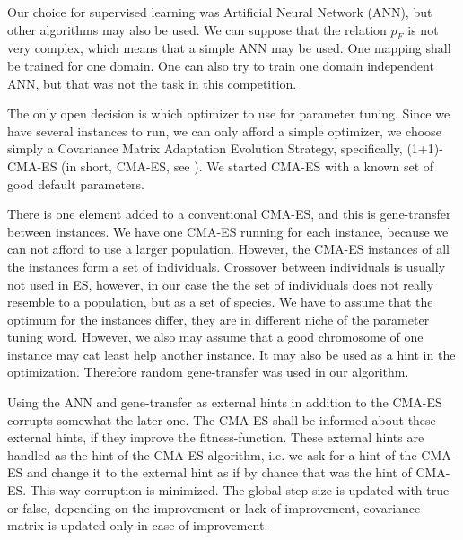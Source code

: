 \documentclass{acm_proc_article-sp}
\begin{document}
Our choice for supervised learning was Artificial Neural Network (ANN), but other algorithms may also be used. We can suppose that the relation \begin{math}p_F\end{math} is not very complex, which means that a simple ANN may be used. One mapping shall be trained for one domain. One can also try to train one domain independent ANN, but that was not the task in this competition.

The only open decision is which optimizer to use for parameter tuning. Since we have several instances to run, we can only afford a simple optimizer, we choose simply a Covariance Matrix Adaptation Evolution Strategy, specifically, (1+1)-CMA-ES (in short, CMA-ES, see \cite{hansen2001ecj}). We started CMA-ES with a known set of good default parameters.

There is one element added to a conventional CMA-ES, and this is gene-transfer between instances. We have one CMA-ES running for each instance, because we can not afford to use a larger population. However, the CMA-ES instances of all the instances form a set of individuals. Crossover between individuals is usually not used in ES, however, in our case the the set of individuals does not really resemble to a population, but as a set of species. We have to assume that the optimum for the instances differ, they are in different niche of the parameter tuning word. However, we also may assume that a good chromosome of one instance may cat least help another instance. It may also be used as a hint in the optimization. Therefore random gene-transfer was used in our algorithm. 

Using the ANN and gene-transfer as external hints in addition to the CMA-ES corrupts somewhat the later one. The CMA-ES shall be informed about these external hints, if they improve the fitness-function. These external hints are handled as the hint of the CMA-ES algorithm, i.e. we ask for a hint of the CMA-ES and change it to the external hint as if by chance that was the hint of CMA-ES. This way corruption is minimized. The global step size is updated with true or false, depending on the improvement or lack of improvement, covariance matrix is updated only in case of improvement.
\end{document}
